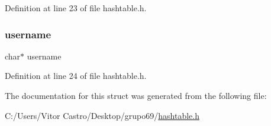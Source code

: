 Definition at line 23 of file hashtable.\+h.

\mbox{\label{structuser_a9b20c006bd90a09e1465fb668700e81d}} 
\subsubsection{\texorpdfstring{username}{username}}
{\footnotesize\ttfamily char$\ast$ username}



Definition at line 24 of file hashtable.\+h.



The documentation for this struct was generated from the following file\+:\begin{DoxyCompactItemize}
\item 
C\+:/\+Users/\+Vitor Castro/\+Desktop/grupo69/\hyperlink{hashtable_8h}{hashtable.\+h}\end{DoxyCompactItemize}
